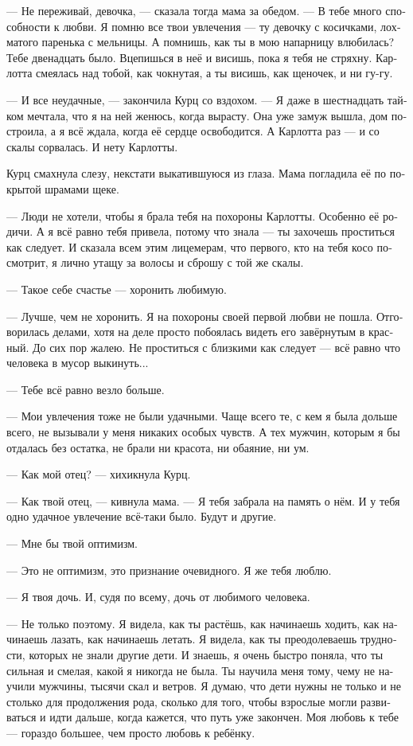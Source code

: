 \documentclass[a4paper,12pt,fleqn]{book}\usepackage{polyglossia}\setdefaultlanguage[babelshorthands=true]{russian}\setotherlanguage{english}\defaultfontfeatures{Ligatures=TeX,Mapping=tex-text}\usepackage{xcolor}\newcommand{\ml}[3]{#2}
\begin{document}
--- Не переживай, девочка, --- сказала тогда мама за обедом.
--- В тебе много способности к любви.
Я помню все твои увлечения --- ту девочку с косичками, лохматого паренька с мельницы.
А помнишь, как ты в мою напарницу влюбилась?
Тебе двенадцать было.
Вцепишься в неё и висишь, пока я тебя не стряхну.
Карлотта смеялась над тобой, как чокнутая, а ты висишь, как щеночек, и ни гу-гу.

--- И все неудачные, --- закончила Курц со вздохом.
--- Я даже в шестнадцать тайком мечтала, что я на ней женюсь, когда вырасту.
Она уже замуж вышла, дом построила, а я всё ждала, когда её сердце освободится.
А Карлотта раз --- и со скалы сорвалась.
И нету Карлотты.

Курц смахнула слезу, некстати выкатившуюся из глаза.
Мама погладила её по покрытой шрамами щеке.

--- Люди не хотели, чтобы я брала тебя на похороны Карлотты.
Особенно её родичи.
А я всё равно тебя привела, потому что знала --- ты захочешь проститься как следует.
И сказала всем этим лицемерам, что первого, кто на тебя косо посмотрит, я лично утащу за волосы и сброшу с той же скалы.

--- Такое себе счастье --- хоронить любимую.

--- Лучше, чем не хоронить.
Я на похороны своей первой любви не пошла.
Отговорилась делами, хотя на деле просто побоялась видеть его завёрнутым в красный.
До сих пор жалею.
Не проститься с близкими как следует --- всё равно что человека в мусор выкинуть...

--- Тебе всё равно везло больше.

--- Мои увлечения тоже не были удачными.
Чаще всего те, с кем я была дольше всего, не вызывали у меня никаких особых чувств.
А тех мужчин, которым я бы отдалась без остатка, не брали ни красота, ни обаяние, ни ум.

--- Как мой отец? --- хихикнула Курц.

--- Как твой отец, --- кивнула мама.
--- Я тебя забрала на память о нём.
И у тебя одно удачное увлечение всё-таки было.
Будут и другие.

--- Мне бы твой оптимизм.

--- Это не оптимизм, это признание очевидного.
Я же тебя люблю.

--- Я твоя дочь.
И, судя по всему, дочь от любимого человека.

--- Не только поэтому.
Я видела, как ты растёшь, как начинаешь ходить, как начинаешь лазать, как начинаешь летать.
Я видела, как ты преодолеваешь трудности, которых не знали другие дети.
И знаешь, я очень быстро поняла, что ты сильная и смелая, какой я никогда не была.
Ты научила меня тому, чему не научили мужчины, тысячи скал и ветров.
Я думаю, что дети нужны не только и не столько для продолжения рода, сколько для того, чтобы взрослые могли развиваться и идти дальше, когда кажется, что путь уже закончен.
Моя любовь к тебе --- гораздо большее, чем просто любовь к ребёнку.
\end{document}
